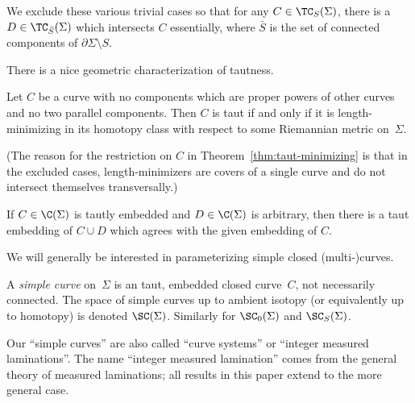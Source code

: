 
We exclude these various trivial cases so that for any $C \in
\TC_S(\Sigma)$, there
is a $D \in \TC_{\bar S}(\Sigma)$ which intersects $C$ essentially, where
$\bar S$ is the set of connected components of $\partial \Sigma \setminus S$.

There is a nice geometric characterization of tautness.

\begin{theorem}
  \label{thm:taut-minimizing}
  Let $C$ be a curve with no components which are proper powers of
  other curves and no two parallel components.
  Then $C$ is taut if and only if it is length-minimizing in its
  homotopy class with respect to some Riemannian metric on~$\Sigma$.
\end{theorem}
  
  

(The reason for the restriction on $C$ in
Theorem~\ref{thm:taut-minimizing} is that in the excluded cases,
length-minimizers are covers of a single curve and do not intersect
themselves transversally.)

\begin{corollary}
  \label{cor:taut-extension}
  If $C\in \C(\Sigma)$ is tautly embedded and $D\in \C(\Sigma)$ is arbitrary, then
  there is a taut embedding of $C \cup D$ which agrees with the given
  embedding of $C$.
\end{corollary}%

We will generally be interested in parameterizing simple closed
(multi-)curves.

\begin{definition}
  \label{def:simple-curve}
  A \emph{simple curve} on~$\Sigma$ is an taut, embedded closed
  curve~$C$, not necessarily connected.
  The space of simple curves up to ambient isotopy (or equivalently up
  to homotopy) is denoted $\SC(\Sigma)$.  Similarly for $\SC_0(\Sigma)$ and
  $\SC_S(\Sigma)$.
\end{definition}
Our ``simple curves'' are also called ``curve systems'' or ``integer
measured laminations''.  The name ``integer measured lamination''
comes from the general theory of measured laminations; all results in
this paper extend to the more general case.

